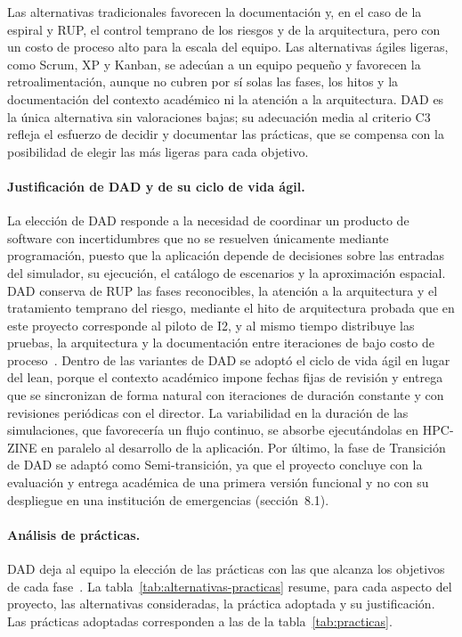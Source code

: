 Las alternativas tradicionales favorecen la documentación y, en el caso de la espiral y RUP, el control temprano de los riesgos y de la arquitectura, pero con un costo de proceso alto para la escala del equipo. Las alternativas ágiles ligeras, como Scrum, XP y Kanban, se adecúan a un equipo pequeño y favorecen la retroalimentación, aunque no cubren por sí solas las fases, los hitos y la documentación del contexto académico ni la atención a la arquitectura. DAD es la única alternativa sin valoraciones bajas; su adecuación media al criterio C3 refleja el esfuerzo de decidir y documentar las prácticas, que se compensa con la posibilidad de elegir las más ligeras para cada objetivo.

\paragraph{Justificación de DAD y de su ciclo de vida ágil.}
La elección de DAD responde a la necesidad de coordinar un producto de software con incertidumbres que no se resuelven únicamente mediante programación, puesto que la aplicación depende de decisiones sobre las entradas del simulador, su ejecución, el catálogo de escenarios y la aproximación espacial. DAD conserva de RUP las fases reconocibles, la atención a la arquitectura y el tratamiento temprano del riesgo, mediante el hito de arquitectura probada que en este proyecto corresponde al piloto de I2, y al mismo tiempo distribuye las pruebas, la arquitectura y la documentación entre iteraciones de bajo costo de proceso~\cite{ambler2012dad, adaptacion2026}. Dentro de las variantes de DAD se adoptó el ciclo de vida ágil en lugar del lean, porque el contexto académico impone fechas fijas de revisión y entrega que se sincronizan de forma natural con iteraciones de duración constante y con revisiones periódicas con el director. La variabilidad en la duración de las simulaciones, que favorecería un flujo continuo, se absorbe ejecutándolas en HPC-ZINE en paralelo al desarrollo de la aplicación. Por último, la fase de Transición de DAD se adaptó como Semi-transición, ya que el proyecto concluye con la evaluación y entrega académica de una primera versión funcional y no con su despliegue en una institución de emergencias (sección~8.1).

\paragraph{Análisis de prácticas.}
DAD deja al equipo la elección de las prácticas con las que alcanza los objetivos de cada fase~\cite{ambler2012dad}. La tabla~\ref{tab:alternativas-practicas} resume, para cada aspecto del proyecto, las alternativas consideradas, la práctica adoptada y su justificación. Las prácticas adoptadas corresponden a las de la tabla~\ref{tab:practicas}.

